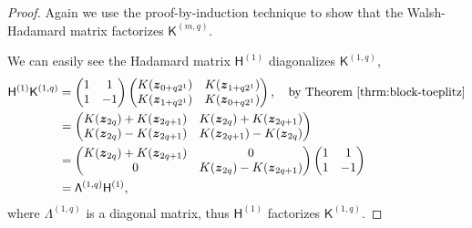 \documentclass{iitthesis}          %
\newcommand{\bm}[1]{\boldsymbol{#1}}
\newcommand{\vz}{\bm{z}}
\newcommand{\mC}{\mathsf{C}}
\newcommand{\mH}{\mathsf{H}}
\newcommand{\mK}{\mathsf{K}}
\newcommand{\mLambda}{\mathsf{\Lambda}}
\begin{document}
\begin{proof}
	
Again we use the proof-by-induction technique to show that the Walsh-Hadamard matrix factorizes $\mK^{(m,q)}$.

We can easily see the Hadamard matrix $\mH^{(1)}$ diagonalizes $\mK^{(1,q)}$,
\begin{align*}
\mH^{(1)} \mK^{(1,q)} &= 
\begin{pmatrix}
1 &  1 \\ 1 & -1
\end{pmatrix}
\begin{pmatrix}
K(\vz_{0 + q2^1}) & K(\vz_{1 + q2^1}) \\ K(\vz_{1 + q2^1}) & K(\vz_{0 + q2^1})
\end{pmatrix}, \quad \text{by Theorem \ref{thrm:block-toeplitz}} 
\\
& = \begin{pmatrix} K(\vz_{2q})+K(\vz_{2q+1}) & K(\vz_{2q})+K(\vz_{2q+1}) \\ K(\vz_{2q})-K(\vz_{2q+1}) & K(\vz_{2q+1})-K(\vz_{2q}) \end{pmatrix} \\ 
& = \begin{pmatrix} K(\vz_{2q})+K(\vz_{2q+1}) & 0 \\ 0 & K(\vz_{2q})-K(\vz_{2q+1}) \end{pmatrix} 
\begin{pmatrix}
1 &  1 \\ 1 & -1
\end{pmatrix} \\
&= \mLambda^{(1,q)} \mH^{(1)},
\end{align*}
where $\mLambda^{(1,q)}$ is a diagonal matrix, thus $\mH^{(1)}$ factorizes $\mK^{(1,q)}$.


\end{proof}
\end{document}
